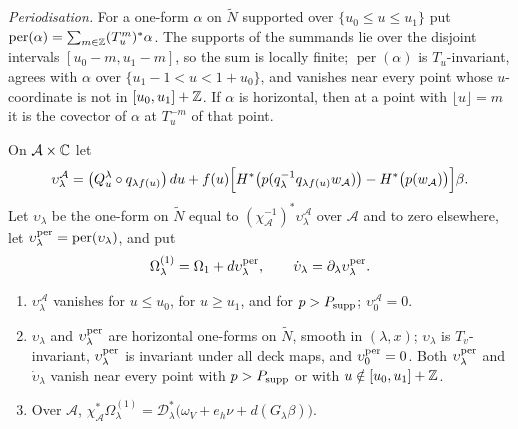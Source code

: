 \emph{Periodisation.} For a one-form $\alpha$ on $\widetilde N$ supported over $\{u_0\le u\le u_1\}$ put
$\operatorname{per}(\alpha)=\sum_{m\in\mathbb{Z}}(T_u^m)^*\alpha$. The supports of the summands lie over the disjoint intervals
$[u_0-m,u_1-m]$, so the sum is locally finite; $\operatorname{per}(\alpha)$ is $T_u$-invariant, agrees with $\alpha$ over
$\{u_1-1<u<1+u_0\}$, and vanishes near every point whose $u$-coordinate is not in $[u_0,u_1]+\mathbb{Z}$. If $\alpha$ is horizontal, then
at a point with $\lfloor u\rfloor=m$ it is the covector of $\alpha$ at $T_u^{-m}$ of that point.

\begin{construction}\label{cons:shd4-eta}
On $\mathcal A\times\mathbb{C}$ let
\[
 \upsilon^{\mathcal A}_\lambda=\bigl(Q^\lambda_u\circ q_{\lambda f(u)}\bigr)\,du
 +f(u)\Bigl[H^*\bigl(p(q_\lambda^{-1}q_{\lambda f(u)}w_{\mathcal A})\bigr)-H^*\bigl(p(w_{\mathcal A})\bigr)\Bigr]\beta .
\]
Let $\upsilon_\lambda$ be the one-form on $\widetilde N$ equal to $(\chi_{\mathcal A}^{-1})^*\upsilon^{\mathcal A}_\lambda$ over $\mathcal A$ and to zero
elsewhere, let $\upsilon^{\rm per}_\lambda=\operatorname{per}(\upsilon_\lambda)$, and put
\[
 \Omega^{(1)}_\lambda=\Omega_1+d\upsilon^{\rm per}_\lambda,\qquad \dot\upsilon_\lambda=\partial_\lambda\upsilon^{\rm per}_\lambda .
\]
\end{construction}

\begin{lemma}\label{lem:shd4-eta}
\begin{enumerate}[label=(\alph*)]
\item $\upsilon^{\mathcal A}_\lambda$ vanishes for $u\le u_0$, for $u\ge u_1$, and for $p>P_{\rm supp}$; $\upsilon^{\mathcal A}_0=0$.
\item $\upsilon_\lambda$ and $\upsilon^{\rm per}_\lambda$ are horizontal one-forms on $\widetilde N$, smooth in $(\lambda,x)$; $\upsilon_\lambda$ is
$T_v$-invariant, $\upsilon^{\rm per}_\lambda$ is invariant under all deck maps, and $\upsilon^{\rm per}_0=0$. Both $\upsilon^{\rm per}_\lambda$ and $\dot\upsilon_\lambda$ vanish near every point with $p>P_{\rm supp}$ or with
$u\notin[u_0,u_1]+\mathbb{Z}$.
\item Over $\mathcal A$,
$\chi_{\mathcal A}^*\Omega^{(1)}_\lambda=\mathcal D_\lambda^*\bigl(\omega_V+e_h\nu+d(G_\lambda\beta)\bigr)$.
\end{enumerate}
\end{lemma}

